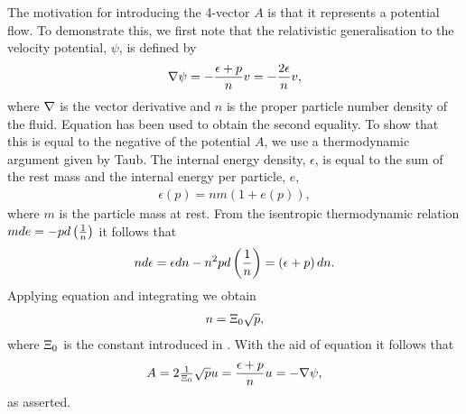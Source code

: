 The motivation for introducing the 4-vector $A$ is that it represents a potential flow.
To demonstrate this, we first note that the relativistic generalisation to the velocity potential, $\psi$,  is defined\cite{LandauBook} by
\begin{align}
 \nabla \psi = - \frac{\epsilon+p}{n} v = - \frac{2\epsilon}{n} v,
\label{eqn:relPot}
\end{align}
where $\nabla$ is the vector derivative and  $n$ is the proper particle number density of the fluid.
Equation  has been used to obtain the second equality.
To show that this is equal to the negative of the potential $A$, we use a thermodynamic argument given by Taub\cite{Taub1978}.
The internal energy density, $\epsilon$, is equal to the sum of the rest mass and the internal energy per particle\cite{LandauBook, Taub1978}, $e$, 
\begin{align}
  \epsilon(p) = nm( 1 + e(p)),
\label{eqn:relEpsilon}
\end{align}
where $m$ is the particle mass at rest.
From the isentropic thermodynamic relation $m de = - p d\left( \frac{1}{n} \right)$
it follows that 
\begin{align}
 n d\epsilon = \epsilon dn - n^2 p d \left( \frac{1}{n} \right) = \left( \epsilon + p \right) dn.
\label{eqn:relNEpsilon}
\end{align}
Applying equation  and integrating we obtain
\begin{align}
n =\Xi_0 \sqrt{   p },
\label{eqn:relN}
\end{align}
where $\Xi_0$ is the constant introduced in .
With the aid of equation  it follows that
\begin{align}
A = 2\tfrac{1}{\Xi_0}\sqrt p  u =\frac{\epsilon + p}{n} u =  -\nabla \psi,
\label{eqn:AisPotFlow}
\end{align}
as asserted.




